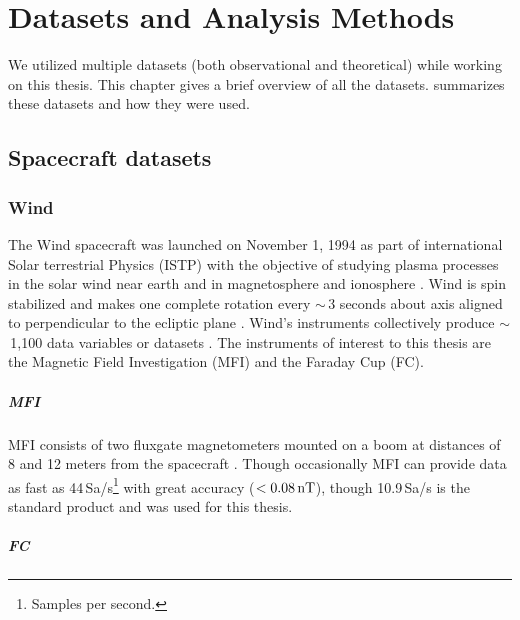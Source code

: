 %
%
\chapter{Datasets and Analysis Methods}\label{chap:chap4}

    We utilized multiple datasets (both observational and theoretical) while working on this thesis.
    This chapter gives a brief overview of all the datasets.  summarizes these
    datasets and how they were used.

    \section{Spacecraft datasets}\label{sec:intr41}

        \subsection{Wind}\label{sec:wind}

            The Wind spacecraft was launched on November 1, 1994 as part of international Solar
            terrestrial Physics (ISTP) with the objective of studying plasma processes in the solar
            wind near earth and in magnetosphere and ionosphere \citep{Acuna1995}. Wind is spin
            stabilized and makes one complete rotation every $\sim$\,3 seconds about axis aligned to
            perpendicular to the ecliptic plane \citep{Acuna1995, WilsonIII2021}. Wind's instruments
            collectively produce $\sim$\,1,100 data variables or datasets \citep{WilsonIII2021}. The
            instruments of interest to this thesis are the Magnetic Field Investigation (MFI) and
            the Faraday Cup (FC). 

            \paragraph*{MFI}\label{sec:mfi}

                MFI consists of two fluxgate magnetometers mounted on a boom at distances of 8 and
                12 meters from the spacecraft \citep{Lepping1995}. Though occasionally MFI can
                provide data as fast as 44\,Sa/s\footnote{Samples per second.} with great accuracy
                ($< 0.08\,\rm nT$), though 10.9\,Sa/s is the standard product and was used for this
                thesis.

            \paragraph*{FC}\label{sec:fc}

